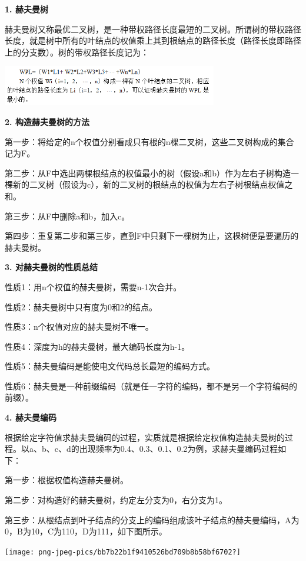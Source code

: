 {\textbf{1. 赫夫曼树}}

{{赫夫曼树又称最优二叉树，是一种带权路径长度最短的二叉树}。所谓树的带权路径长度，就是树中所有的叶结点的权值乘上其到根结点的路径长度（路径长度即路径上的分支数）。树的带权路径长度记为：}

\includegraphics[width=3.70833in,height=0.68750in]{png-jpeg-pics/55D22CD2B0D12A01E2475DA33D5F35E2.png}

{\textbf{2. 构造赫夫曼树的方法}}

{{第一步：}将给定的n个权值分别看成只有根的n棵二叉树，这些二叉树构成的集合记为F。}

{{第二步：}从F中选出两棵根结点的权值最小的树（假设a和b）作为左右子树构造一棵新的二叉树（假设为c），新的二叉树的根结点的权值为左右子树根结点权值之和。}

{{第三步：}从F中删除a和b，加入c。}

{{第四步：}重复第二步和第三步，直到F中只剩下一棵树为止，这棵树便是要遍历的赫夫曼树。}

{\textbf{3. 对赫夫曼树的性质总结}}

{{性质1：}用n个权值的赫夫曼树，需要n-1次合并。}

{{性质2：}赫夫曼树中只有度为0和2的结点。}

{{性质3：}n个权值对应的赫夫曼树不唯一。}

{{性质4：}{深度为h的赫夫曼树，最大编码长度为h-1。}}

{{性质5：}{赫夫曼编码是能使电文代码总长最短的编码方式。}}

{{{性质6：}赫夫曼是一种前缀编码（就是任一字符的编码，都不是另一个字符编码的前缀）。}}

{\textbf{4. 赫夫曼编码}}

{根据给定字符值求赫夫曼编码的过程，实质就是根据给定权值构造赫夫曼树的过程。以a、b、c、d的出现频率为0.4、0.3、0.1、0.2为例，求赫夫曼编码过程如下：}

{{第一步：}根据权值构造赫夫曼树。}

{{第二步：}对构造好的赫夫曼树，约定左分支为0，右分支为1。}

{{第三步：}从根结点到叶子结点的分支上的编码组成该叶子结点的赫夫曼编码，A为0，B为10，C为110，D为111，如下图所示。}

{\texttt{[image: png-jpeg-pics/bb7b22b1f9410526bd709b8b58bf6702?]}}
